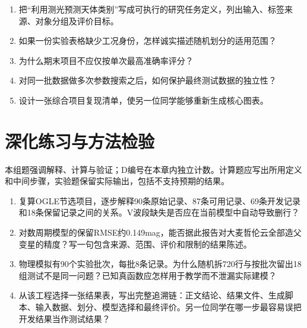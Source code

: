 \chapterexercise
\begin{enumerate}
\item 把“利用测光预测天体类别”写成可执行的研究任务定义，列出输入、标签来源、对象分组及评价目标。
\item 如果一份实验表格缺少工况身份，怎样诚实描述随机划分的适用范围？
\item 为什么期末项目不应仅按单次最高准确率评分？
\item 对同一批数据做多次参数搜索之后，如何保护最终测试数据的独立性？
\item 设计一张综合项目复现清单，使另一位同学能够重新生成核心图表。
\end{enumerate}

\section*{深化练习与方法检验}
本组题强调解释、计算与验证；D编号在本章内独立计数。计算题应写出所用定义和中间步骤，实验题保留实际输出，包括不支持预期的结果。
\begin{enumerate}[label=D\arabic*.]
\item 复算OGLE节选项目，逐步解释90条原始记录、87条可用记录、69条开发记录和18条保留记录之间的关系。V波段缺失是否应在当前模型中自动导致删行？
\item 对数周期模型的保留RMSE约0.149mag，能否据此报告对大麦哲伦云全部造父变星的精度？写一句包含来源、范围、评价和限制的结果陈述。
\item 物理模拟有90个实验批次，每批8条记录。为什么随机拆720行与按批次留出18组测试不是同一问题？已知真函数应怎样用于教学而不泄漏实际建模？
\item 从该工程选择一张结果表，写出完整追溯链：正文结论、结果文件、生成脚本、输入数据、划分、模型选择和最终评价。另一位同学在哪一步最容易误把开发结果当作测试结果？
\end{enumerate}
